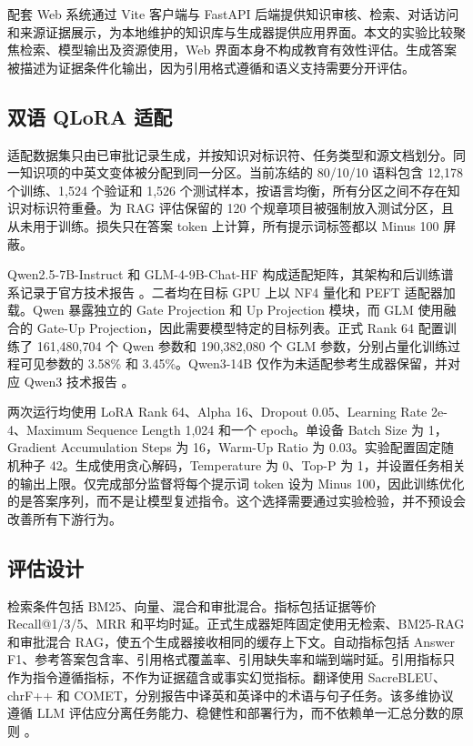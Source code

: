 配套 Web 系统通过 Vite 客户端与 FastAPI 后端提供知识审核、检索、对话访问和来源证据展示，为本地维护的知识库与生成器提供应用界面。本文的实验比较聚焦检索、模型输出及资源使用，Web 界面本身不构成教育有效性评估。生成答案被描述为证据条件化输出，因为引用格式遵循和语义支持需要分开评估。

\subsection{双语 QLoRA 适配}

适配数据集只由已审批记录生成，并按知识对标识符、任务类型和源文档划分。同一知识项的中英文变体被分配到同一分区。当前冻结的 80/10/10 语料包含 12,178 个训练、1,524 个验证和 1,526 个测试样本，按语言均衡，所有分区之间不存在知识对标识符重叠。为 RAG 评估保留的 120 个规章项目被强制放入测试分区，且从未用于训练。损失只在答案 token 上计算，所有提示词标签都以 Minus 100 屏蔽。

Qwen2.5-7B-Instruct 和 GLM-4-9B-Chat-HF 构成适配矩阵，其架构和后训练谱系记录于官方技术报告 \citep{qwen2024technical,glm2024chatglm}。二者均在目标 GPU 上以 NF4 量化和 PEFT 适配器加载。Qwen 暴露独立的 Gate Projection 和 Up Projection 模块，而 GLM 使用融合的 Gate-Up Projection，因此需要模型特定的目标列表。正式 Rank 64 配置训练了 161,480,704 个 Qwen 参数和 190,382,080 个 GLM 参数，分别占量化训练过程可见参数的 3.58\% 和 3.45\%。Qwen3-14B 仅作为未适配参考生成器保留，并对应 Qwen3 技术报告 \citep{qwen2025technical}。

两次运行均使用 LoRA Rank 64、Alpha 16、Dropout 0.05、Learning Rate 2e-4、Maximum Sequence Length 1,024 和一个 epoch。单设备 Batch Size 为 1，Gradient Accumulation Steps 为 16，Warm-Up Ratio 为 0.03。实验配置固定随机种子 42。生成使用贪心解码，Temperature 为 0、Top-P 为 1，并设置任务相关的输出上限。仅完成部分监督将每个提示词 token 设为 Minus 100，因此训练优化的是答案序列，而不是让模型复述指令。这个选择需要通过实验检验，并不预设会改善所有下游行为。

\subsection{评估设计}

检索条件包括 BM25、向量、混合和审批混合。指标包括证据等价 Recall@1/3/5、MRR 和平均时延。正式生成器矩阵固定使用无检索、BM25-RAG 和审批混合 RAG，使五个生成器接收相同的缓存上下文。自动指标包括 Answer F1、参考答案包含率、引用格式覆盖率、引用缺失率和端到端时延。引用指标只作为指令遵循指标，不作为证据蕴含或事实幻觉指标。翻译使用 SacreBLEU、chrF++ 和 COMET，分别报告中译英和英译中的术语与句子任务。该多维协议遵循 LLM 评估应分离任务能力、稳健性和部署行为，而不依赖单一汇总分数的原则 \citep{chang2024survey}。

